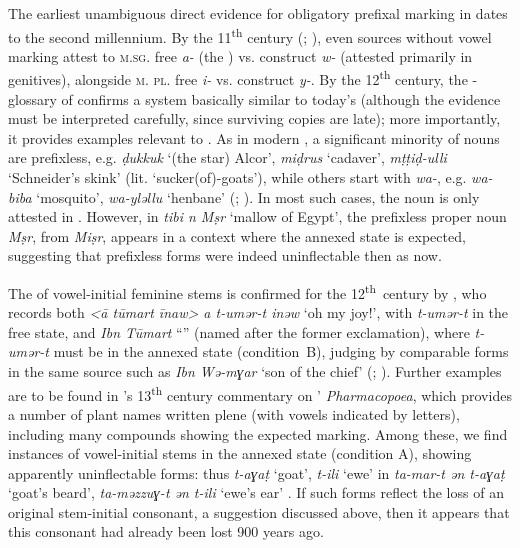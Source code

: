 \documentclass[output=paper,colorlinks,citecolor=brown]{langscibook}
\begin{document}
The earliest unambiguous direct evidence for obligatory prefixal  marking in  dates to the second millennium. By the 11\textsuperscript{th} century (\citealt{chaker1981}; \citealt[113]{vandenboogert1997}), even sources without vowel marking attest to \textsc{m.sg.} free \emph{a-} (the ) vs. construct \emph{w-} (attested primarily in genitives), alongside \textsc{m. pl.} free \emph{i-} vs. construct \emph{y-}. By the 12\textsuperscript{th} century, the - glossary of  confirms a  system basically similar to today's (although the evidence must be interpreted carefully, since surviving copies are late); more importantly, it provides examples relevant to . As in modern , a significant minority of nouns are prefixless, e.g. \emph{ḍukkuk} `(the star) Alcor', \emph{miḍrus} `cadaver', \emph{mṭṭiḍ-ulli} `Schneider's skink' (lit. `sucker(of)-goats'), while others start with \emph{wa-}, e.g. \emph{wa-biba} `mosquito', \emph{wa-yləllu} `henbane' (\citealt[106, 119]{vandenboogert1997}; \citealt{amennou2021}). In most such cases, the noun is only attested in . However, in \emph{tibi n Mṣr} `mallow of Egypt', the prefixless proper noun \emph{Mṣr}, from  \emph{Miṣr}, appears in a context where the annexed state is expected, suggesting that prefixless forms were indeed uninflectable then as now.

{\sloppy The  of vowel-initial feminine stems is confirmed for the 12\textsuperscript{th}~century by , who records both \emph{\textless ā tūmart īnaw\textgreater{} a t-umər-t inəw} `oh my joy!', with \emph{t-umər-t} in the free state, and \emph{Ibn Tūmart} ``'' (named after the former exclamation), where \emph{t-umər-t} must be in the annexed state (condition~B), judging by comparable forms in the same source such as \emph{Ibn Wə-mɣar} `son of the chief' (\citealt[109--112]{vandenboogert1997}; \citealt{marcy1932}). Further examples are to be found in 's 13\textsuperscript{th} century commentary on ' \emph{Pharmacopoea}, which provides a number of plant names written plene (with vowels indicated by letters), including many  compounds showing the expected  marking. Among these, we find instances of vowel-initial stems in the annexed state (condition A), showing apparently uninflectable forms: thus \emph{t-aɣaṭ} `goat', \emph{t-ili} `ewe' in \emph{ta-mar-t ən t-aɣaṭ} `goat's beard', \emph{ta-məzzuɣ-t ən t-ili} `ewe's ear' \citep[121]{vandenboogert1997}. If such forms reflect the loss of an original stem-initial consonant, a suggestion discussed above, then it appears that this consonant had already been lost 900 years ago.\par}
\end{document}
